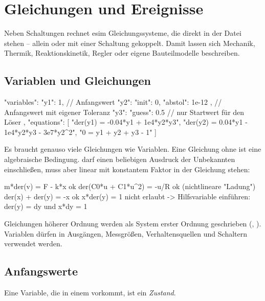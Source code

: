 \chapter{Gleichungen und Ereignisse}
\label{kap:format-gleichungen}

Neben Schaltungen rechnet esim Gleichungssysteme, die direkt in der Datei
stehen – allein oder mit einer Schaltung gekoppelt. Damit lassen sich
Mechanik, Thermik, Reaktionskinetik, Regler oder eigene Bauteilmodelle
beschreiben.

\section{Variablen und Gleichungen}

\begin{json}
"variables": {
  "y1": 1,                               // Anfangswert
  "y2": { "init": 0, "abstol": 1e-12 },  // Anfangswert mit eigener Toleranz
  "y3": { "guess": 0.5 }                 // nur Startwert für den Löser
},
"equations": [
  "der(y1) = -0.04*y1 + 1e4*y2*y3",
  "der(y2) =  0.04*y1 - 1e4*y2*y3 - 3e7*y2^2",
  "0 = y1 + y2 + y3 - 1"
]
\end{json}

Es braucht genauso viele Gleichungen wie Variablen. Eine Gleichung ohne
 ist eine algebraische Bedingung.  darf einen
beliebigen Ausdruck der Unbekannten einschließen, muss aber linear mit
konstantem Faktor in der Gleichung stehen:

\begin{shell}
m*der(v) = F - k*x              ok
der(C0*u + C1*u^2) = -u/R       ok (nichtlineare "Ladung")
der(x) + der(y) = -x            ok
x*der(y) = 1                    nicht erlaubt -> Hilfsvariable einführen:
                                der(y) = dy  und  x*dy = 1
\end{shell}

Gleichungen höherer Ordnung werden als System erster Ordnung geschrieben
(, ). Variablen dürfen in Ausgängen,
Messgrößen, Verhaltensquellen und Schaltern verwendet werden.

\section{Anfangswerte}
\label{sec:anfangswerte}

Eine Variable, die in einem  vorkommt, ist ein \emph{Zustand}.

